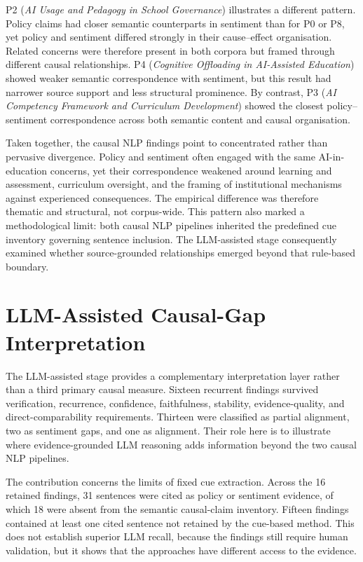 P2 (\textit{AI Usage and Pedagogy in School Governance}) illustrates a different
pattern. Policy claims had closer semantic counterparts in sentiment than for P0 or
P8, yet policy and sentiment differed strongly in their cause--effect organisation.
Related concerns were therefore present in both corpora but framed through different
causal relationships. P4 (\textit{Cognitive Offloading in AI-Assisted Education})
showed weaker semantic correspondence with sentiment, but this result had narrower
source support and less structural prominence. By contrast, P3 (\textit{AI Competency
Framework and Curriculum Development}) showed the closest policy--sentiment
correspondence across both semantic content and causal organisation.

Taken together, the causal NLP findings point to concentrated rather than pervasive
divergence. Policy and sentiment often engaged with the same AI-in-education
concerns, yet their correspondence weakened around learning and assessment,
curriculum oversight, and the framing of institutional mechanisms against experienced
consequences. The empirical difference was therefore thematic and structural, not
corpus-wide. This pattern also marked a methodological limit: both causal NLP
pipelines inherited the predefined cue inventory governing sentence inclusion. The
LLM-assisted stage consequently examined whether source-grounded relationships
emerged beyond that rule-based boundary.


\section{LLM-Assisted Causal-Gap Interpretation}
\label{sec:analysis-llm-causal-gap}

The LLM-assisted stage provides a complementary interpretation layer rather than a
third primary causal measure. Sixteen recurrent findings survived verification,
recurrence, confidence, faithfulness, stability, evidence-quality, and
direct-comparability requirements. Thirteen were classified as partial alignment,
two as sentiment gaps, and one as alignment. Their role here is to illustrate where
evidence-grounded LLM reasoning adds information beyond the two causal NLP pipelines.

The contribution concerns the limits of fixed cue extraction. Across the
16 retained findings, 31 sentences were cited as policy or sentiment
evidence, of which 18 were absent from the semantic causal-claim inventory.
Fifteen findings contained at least one cited sentence not retained by the
cue-based method. This does not establish superior LLM recall, because the findings
still require human validation, but it shows that the approaches have different
access to the evidence.

